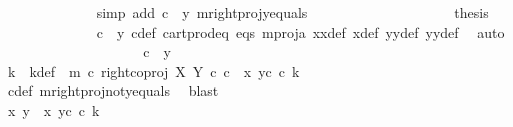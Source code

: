 \begin{isabellebody}
\ \ \ \ \ \ \ \ \ \ \ \ \isamarkupfalse%
\ {\isacharparenleft}{\kern0pt}simp\ add{\isacharcolon}{\kern0pt}\ {\isacartoucheopen}c\ {\isacharequal}{\kern0pt}\ y{}{\isacartoucheclose}\ m{\isacharunderscore}{\kern0pt}rightproj{\isacharunderscore}{\kern0pt}y{}{\isacharunderscore}{\kern0pt}equals{\isacharparenright}{\kern0pt}\ \ \ \ \ \ \ \isanewline
\ \ \ \ \ \ \ \ \ \ \isamarkupfalse%
\ \isamarkupfalse%
\ {\isacharquery}{\kern0pt}thesis\isanewline
\ \ \ \ \ \ \ \ \ \ \ \ \isamarkupfalse%
\ {\isacartoucheopen}c\ {\isacharequal}{\kern0pt}\ y{}{\isacartoucheclose}\ c{\isacharunderscore}{\kern0pt}def\ cart{\isacharunderscore}{\kern0pt}prod{\isacharunderscore}{\kern0pt}eq{}\ eqs\ m{\isacharunderscore}{\kern0pt}proj{\isacharunderscore}{\kern0pt}a\ x{}x{}{\isacharunderscore}{\kern0pt}def{\isacharparenleft}{\kern0pt}{}{\isacharparenright}{\kern0pt}\ x{\isacharunderscore}{\kern0pt}def\ y{}y{}{\isacharunderscore}{\kern0pt}def{\isacharparenleft}{\kern0pt}{}{\isacharparenright}{\kern0pt}\ y{}y{}{\isacharunderscore}{\kern0pt}def{\isacharparenleft}{\kern0pt}{}{\isacharparenright}{\kern0pt}\ \isamarkupfalse%
\ auto\isanewline
\ \ \ \ \ \ \ \ \isamarkupfalse%
\isanewline
\ \ \ \ \ \ \ \ \ \ \isamarkupfalse%
\ {\isachardoublequoteopen}c\ {\isasymnoteq}\ y{}{\isachardoublequoteclose}\ \ \ \ \ \ \ \isanewline
\ \ \ \ \ \ \ \ \ \ \isamarkupfalse%
\ \isamarkupfalse%
\ k\ \ k{\isacharunderscore}{\kern0pt}def{\isacharcolon}{\kern0pt}\ \ {\isachardoublequoteopen}m\ {\isasymcirc}\isactrlsub c\ right{\isacharunderscore}{\kern0pt}coproj\ X\ Y\ {\isasymcirc}\isactrlsub c\ c\ {\isacharequal}{\kern0pt}\ {\isasymlangle}x{}{\isacharcomma}{\kern0pt}\ y{}\isactrlsup c\ {\isasymcirc}\isactrlsub c\ k{\isasymrangle}{\isachardoublequoteclose}\isanewline
\ \ \ \ \ \ \ \ \ \ \ \ \isamarkupfalse%
\ c{\isacharunderscore}{\kern0pt}def\ m{\isacharunderscore}{\kern0pt}rightproj{\isacharunderscore}{\kern0pt}not{\isacharunderscore}{\kern0pt}y{}{\isacharunderscore}{\kern0pt}equals\ \isamarkupfalse%
\ blast\ \ \ \ \ \ \ \ \ \ \ \ \ \ \ \ \ \ \ \ \ \isanewline
\ \ \ \ \ \ \ \ \ \ \isamarkupfalse%
\ \isamarkupfalse%
\ {\isachardoublequoteopen}{\isasymlangle}x{\isacharcomma}{\kern0pt}\ y{}{\isasymrangle}\ {\isacharequal}{\kern0pt}\ {\isasymlangle}x{}{\isacharcomma}{\kern0pt}\ y{}\isactrlsup c\ {\isasymcirc}\isactrlsub c\ k{\isasymrangle}{\isachardoublequoteclose}\isanewline

\end{isabellebody}

